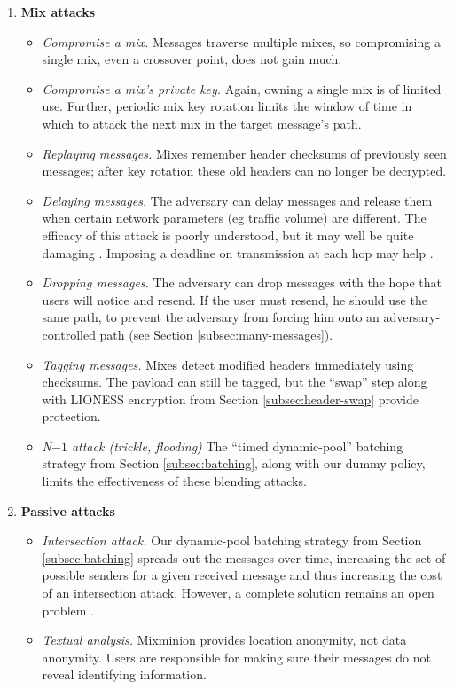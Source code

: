 \documentclass[11pt]{IEEEtran}
\begin{document}
\begin{enumerate}
\item \textbf{Mix attacks}

\begin{itemize}
\item \emph{Compromise a mix.} Messages traverse multiple mixes, so
compromising a single mix, even a crossover point, does not gain much.
\item \emph{Compromise a mix's private key.} Again, owning a single mix
is of limited use. Further, periodic mix key rotation limits the window
of time in which to attack the next mix in the target message's path.
\item \emph{Replaying messages.}  Mixes remember header checksums of
previously seen messages; after key rotation these old headers can no
longer be decrypted.
\item \emph{Delaying messages.} The adversary can delay messages and
release them when certain network parameters (eg traffic volume) are
different. The efficacy of this attack is poorly understood, but it may
well be quite damaging \cite{batching-taxonomy}. Imposing a deadline on
transmission at each hop may help \cite{mix-acc}.
\item \emph{Dropping messages.} The adversary can drop messages with the
hope that users will notice and resend. If the user must resend, he
should use the same path, to prevent the adversary from forcing him onto
an adversary-controlled path (see Section \ref{subsec:many-messages}).
\item \emph{Tagging messages.} Mixes detect modified headers immediately
using checksums. The payload can still be tagged, but the ``swap'' step
along with LIONESS encryption from Section \ref{subsec:header-swap}
provide protection.
\item \emph{N$-1$ attack (trickle, flooding)} The ``timed dynamic-pool''
batching strategy from Section \ref{subsec:batching}, along with our dummy
policy, limits the effectiveness of these blending attacks.
\end{itemize}

\item \textbf{Passive attacks}

\begin{itemize}
\item \emph{Intersection attack.} Our dynamic-pool batching strategy
from Section \ref{subsec:batching} spreads out the messages over time,
increasing the set of possible senders for a given received message and
thus increasing the cost of an intersection attack. However, a complete
solution remains an open problem \cite{langos02}.
\item \emph{Textual analysis.} Mixminion provides location anonymity,
not data anonymity. Users are responsible for making sure their messages
do not reveal identifying information.
\end{itemize}


\end{enumerate}
\end{document}
